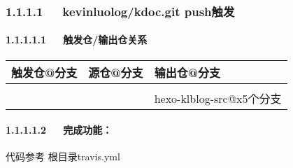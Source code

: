 \documentclass[letterpaper,12pt,english]{sphinxmanual}
\begin{document}
\subsubsection{1.1.1.1   kevinluolog/kdoc.git push触发}
\label{\detokenize{001software/001install/001._u7f51_u7ad9/gitpage:kevinluolog-kdoc-git-push}}

\paragraph{1.1.1.1.1   触发仓/输出仓关系}
\label{\detokenize{001software/001install/001._u7f51_u7ad9/gitpage:id1}}

\begin{savenotes}\sphinxattablestart
\centering
\begin{tabulary}{\linewidth}[t]{|T|T|T|}
\hline
\sphinxstyletheadfamily 
触发仓@分支
&\sphinxstyletheadfamily 
源仓@分支
&\sphinxstyletheadfamily 
输出仓@分支
\\
\hline
{}
&
&
\\
\hline
{}
&
&
hexo-klblog-src@x5个分支
\\
\hline
\end{tabulary}
\par
\sphinxattableend\end{savenotes}


\paragraph{1.1.1.1.2   完成功能：}
\label{\detokenize{001software/001install/001._u7f51_u7ad9/gitpage:id2}}
代码参考 根目录travis.yml
\end{document}
